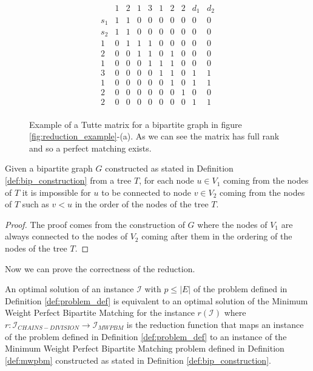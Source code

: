 \begin{figure}
    \centering
    \[
    \begin{array}{c|ccccccccc}
            & \text{1} & \text{2} & \text{1} & \text{3} & \text{1} & \text{2} & \text{2} & \text{$d_1$} & \text{$d_2$} \\
        \hline
        \text{$s_1$} & 1 & 1 & 0 & 0 & 0 & 0 & 0 & 0 & 0 \\
        \text{$s_2$} & 1 & 1 & 0 & 0 & 0 & 0 & 0 & 0 & 0 \\
        \text{1}   & 0 & 1 & 1 & 1 & 0 & 0 & 0 & 0 & 0 \\
        \text{2}   & 0 & 0 & 1 & 1 & 0 & 1 & 0 & 0 & 0 \\
        \text{1}   & 0 & 0 & 0 & 1 & 1 & 1 & 0 & 0 & 0 \\
        \text{3}   & 0 & 0 & 0 & 0 & 1 & 1 & 0 & 1 & 1 \\
        \text{1}   & 0 & 0 & 0 & 0 & 0 & 1 & 0 & 1 & 1 \\
        \text{2}   & 0 & 0 & 0 & 0 & 0 & 0 & 1 & 0 & 0 \\
        \text{2}   & 0 & 0 & 0 & 0 & 0 & 0 & 0 & 1 & 1 \\
    \end{array}
    \]
    \caption[Tutte matrix example]{Example of a Tutte matrix for a bipartite graph in figure \ref{fig:reduction_example}-(a). As we can see the matrix has full rank and so a perfect matching exists.}
    \label{fig:tutte_matrix_ex}
\end{figure}

\begin{lemma} \label{lemma:greater_nodes}
    Given a bipartite graph $G$ constructed as stated in Definition \ref{def:bip_construction} from a tree $T$, for each node $u \in V_1$ coming from the nodes of $T$ it is impossible for $u$ to be connected to node $v \in V_2$ coming from the nodes of $T$ such as $v < u$ in the order of the nodes of the tree $T$.
\end{lemma}

\begin{proof}
    The proof comes from the construction of $G$ where the nodes of $V_1$ are always connected to the nodes of $V_2$ coming after them in the ordering of the nodes of the tree $T$.
\end{proof}

Now we can prove the correctness of the reduction.

\begin{theorem}
    An optimal solution of an instance $\mathcal I$ with $p \leq |E|$ of the problem defined in Definition \ref{def:problem_def} is equivalent to an optimal solution of the Minimum Weight Perfect Bipartite Matching for the instance $r(\mathcal I)$ where $r: \mathcal{I}_{CHAINS-DIVISION} \rightarrow \mathcal{I}_{MWPBM}$ is the reduction function that maps an instance of the problem defined in Definition \ref{def:problem_def} to an instance of the Minimum Weight Perfect Bipartite Matching problem defined in Definition \ref{def:mwpbm} constructed as stated in Definition \ref{def:bip_construction}.
\end{theorem}

